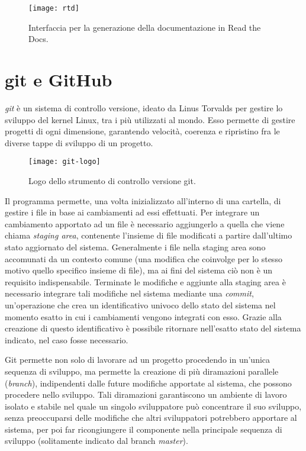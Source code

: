 \begin{figure}[h]
	\center
	\texttt{[image: rtd]}
	\caption[Schermata di build di Read the Docs.]{Interfaccia per la generazione della documentazione in Read the Docs.}
	\label{fig:rtd-build}
\end{figure}

\section{git e GitHub}
\nocite{git}
\emph{git} è un sistema di controllo versione, ideato da Linus Torvalds per
gestire lo sviluppo del kernel Linux\cite{wiki:git}, tra i più utilizzati al mondo.
Esso permette di gestire progetti di ogni dimensione, garantendo velocità,
coerenza e ripristino fra le diverse tappe di sviluppo di un progetto.

\begin{wrapfigure} {O} {0.35\textwidth}
	\begin{centering}	
		\texttt{[image: git-logo]}
		\caption[Logo git]{Logo dello strumento di controllo versione git.}
	\end{centering}
\end{wrapfigure}

Il programma permette, una volta inizializzato all'interno di una cartella,
di gestire i file in base ai cambiamenti ad essi effettuati. Per integrare
un cambiamento apportato ad un file è necessario aggiungerlo a quella
che viene chiama \emph{staging area}, contenente l'insieme
di file modificati a partire dall'ultimo stato aggiornato del sistema.
Generalmente i file nella staging area sono accomunati da un contesto
comune (una modifica che coinvolge per lo stesso motivo quello specifico
insieme di file), ma ai fini del sistema ciò non è un requisito indispensabile.
Terminate le modifiche e aggiunte alla staging area è necessario integrare
tali modifiche nel sistema mediante una \emph{commit}, un'operazione
che crea un identificativo univoco dello stato del sistema nel momento esatto
in cui i cambiamenti vengono integrati con esso. Grazie alla creazione
di questo identificativo è possibile ritornare nell'esatto stato
del sistema indicato, nel caso fosse necessario.

Git permette non solo di lavorare ad un progetto procedendo in un'unica
sequenza di sviluppo, ma permette la creazione di più diramazioni parallele
(\emph{branch}), indipendenti dalle future modifiche apportate al sistema,
che possono procedere nello sviluppo. Tali diramazioni garantiscono un
ambiente di lavoro isolato e stabile nel quale un singolo sviluppatore può
concentrare il suo sviluppo, senza preoccuparsi delle modifiche che altri
sviluppatori potrebbero apportare al sistema, per poi far ricongiungere
il componente nella principale sequenza di sviluppo (solitamente indicato
dal branch \emph{master}).

